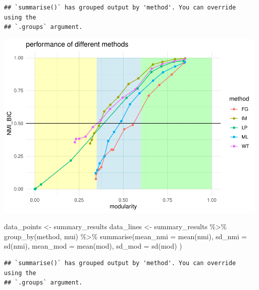 \documentclass[
]{article}
\newenvironment{Shaded}{\begin{snugshade}}{\end{snugshade}}
\newcommand{\AttributeTok}[1]{\textcolor[rgb]{0.77,0.63,0.00}{#1}}
\newcommand{\FunctionTok}[1]{\textcolor[rgb]{0.00,0.00,0.00}{#1}}
\newcommand{\NormalTok}[1]{#1}
\newcommand{\OtherTok}[1]{\textcolor[rgb]{0.56,0.35,0.01}{#1}}
\newcommand{\SpecialCharTok}[1]{\textcolor[rgb]{0.00,0.00,0.00}{#1}}
\begin{document}
\begin{verbatim}
## `summarise()` has grouped output by 'method'. You can override using the
## `.groups` argument.
\end{verbatim}

\includegraphics{com_det_algorithms_files/figure-latex/unnamed-chunk-15-1.pdf}

\begin{Shaded}
\begin{Highlighting}[]
\NormalTok{ data\_points }\OtherTok{\textless{}{-}}\NormalTok{ summary\_results}
\NormalTok{data\_lines }\OtherTok{\textless{}{-}}\NormalTok{ summary\_results }\SpecialCharTok{\%\textgreater{}\%} \FunctionTok{group\_by}\NormalTok{(method, mui) }\SpecialCharTok{\%\textgreater{}\%} 
    \FunctionTok{summarise}\NormalTok{(}\AttributeTok{mean\_nmi =} \FunctionTok{mean}\NormalTok{(nmi), }\AttributeTok{sd\_nmi =} \FunctionTok{sd}\NormalTok{(nmi), }
              \AttributeTok{mean\_mod =} \FunctionTok{mean}\NormalTok{(mod), }\AttributeTok{sd\_mod =} \FunctionTok{sd}\NormalTok{(mod) ) }
\end{Highlighting}
\end{Shaded}

\begin{verbatim}
## `summarise()` has grouped output by 'method'. You can override using the
## `.groups` argument.
\end{verbatim}
\end{document}
